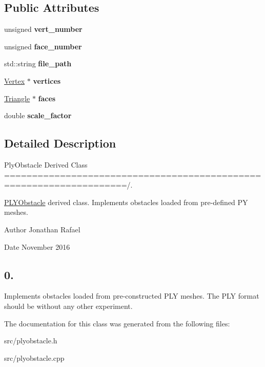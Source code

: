 \subsection*{Public Attributes}
\begin{DoxyCompactItemize}
\item 
\mbox{\label{class_p_l_y_obstacle_a5e14e62690601a6273147aca53751569}} 
unsigned {\bfseries vert\+\_\+number}
\item 
\mbox{\label{class_p_l_y_obstacle_a9664285e5921c10b8d05954849f23e8d}} 
unsigned {\bfseries face\+\_\+number}
\item 
\mbox{\label{class_p_l_y_obstacle_ab384ad44fb6165d7d7277157e774ba40}} 
std\+::string {\bfseries file\+\_\+path}
\item 
\mbox{\label{class_p_l_y_obstacle_a59d10b1c902e053caaf905e81bb618a6}} 
\hyperlink{class_vertex}{Vertex} $\ast$ {\bfseries vertices}
\item 
\mbox{\label{class_p_l_y_obstacle_acd5752df4a98fbe92382184d732ddbc9}} 
\hyperlink{class_triangle}{Triangle} $\ast$ {\bfseries faces}
\item 
\mbox{\label{class_p_l_y_obstacle_a3ddffa50af76259975a4b8d13c1019da}} 
double {\bfseries scale\+\_\+factor}
\end{DoxyCompactItemize}


\subsection{Detailed Description}
Ply\+Obstacle Derived Class ====================================================================/. 

\hyperlink{class_p_l_y_obstacle}{P\+L\+Y\+Obstacle} derived class. Implements obstacles loaded from pre-\/defined PY meshes. \begin{DoxyAuthor}{Author}
Jonathan Rafael 
\end{DoxyAuthor}
\begin{DoxyDate}{Date}
November 2016 \subsection*{0. }
\end{DoxyDate}


Implements obstacles loaded from pre-\/constructed P\+LY meshes. The P\+LY format should be without any other experiment. 

The documentation for this class was generated from the following files\+:\begin{DoxyCompactItemize}
\item 
src/plyobstacle.\+h\item 
src/plyobstacle.\+cpp\end{DoxyCompactItemize}
